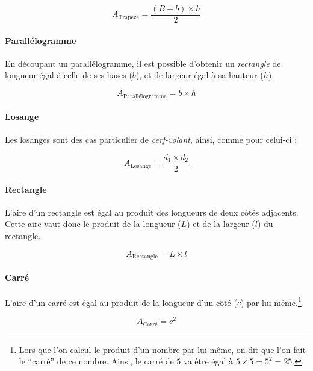 \documentclass[a4paper, twoside]{article}
\begin{document}
$$A_{\text{Trapèze}} = \frac {(B+b) \times h}{2}$$

\vspace*{-0.25cm}

\paragraph*{Parallélogramme}

En découpant un parallélogramme,
il est possible d'obtenir un \textit{rectangle} de longueur égal à celle de ses bases ($b$),
et de largeur égal à sa hauteur ($h$).

$$A_{\text{Parallélogramme}} = b \times h$$

\vspace*{-0.25cm}

\paragraph*{Losange}

Les losanges sont des cas particulier de \textit{cerf-volant},
ainsi, comme pour celui-ci :

$$A_{\text{Losange}} = \frac{ d_{1} \times d_{2} }{ 2 }$$

\vspace*{-0.25cm}

\paragraph*{Rectangle}

L'aire d'un rectangle est égal au produit des longueurs de deux
côtés adjacents. Cette aire vaut donc le produit de la
longueur ($L$) et de la largeur ($l$) du rectangle.

$$A_{\text{Rectangle}} = L \times l$$

\vspace*{-0.25cm}

\paragraph*{Carré}

L'aire d'un carré est égal au produit de la longueur d'un côté
($c$) par lui-même.\footnote{Lors que l'on calcul le produit d'un nombre
	par lui-même, on dit que l'on fait le “carré” de ce nombre.
	Ainsi, le carré de $5$ va être égal à $5 \times 5 = 5^{2} = 25$.}

$$A_{\text{Carré}} = c^{2}$$

\newlength{\hauteurImage}
\setlength{\hauteurImage}{3.5cm}
\end{document}
